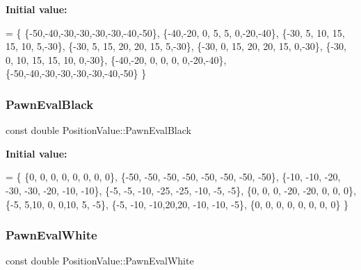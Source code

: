 {\bfseries Initial value\+:}
\begin{DoxyCode}
=
        \{
                \{-50,-40,-30,-30,-30,-30,-40,-50\},
                \{-40,-20,  0,  5,  5,  0,-20,-40\},
                \{-30,  5, 10, 15, 15, 10,  5,-30\},
                \{-30,  5, 15, 20, 20, 15,  5,-30\},
                \{-30,  0, 15, 20, 20, 15,  0,-30\},
                \{-30,  0, 10, 15, 15, 10,  0,-30\},
                \{-40,-20,  0,  0,  0,  0,-20,-40\},
                \{-50,-40,-30,-30,-30,-30,-40,-50\}
        \}
\end{DoxyCode}
\mbox{\label{class_position_value_a4b09d260029ea68a73f44ddf92db45be}} 
\subsubsection{\texorpdfstring{Pawn\+Eval\+Black}{PawnEvalBlack}}
{\footnotesize\ttfamily const double Position\+Value\+::\+Pawn\+Eval\+Black\hspace{0.3cm}{\ttfamily [static]}}

{\bfseries Initial value\+:}
\begin{DoxyCode}
=
        \{
                \{0,  0,  0,  0,  0,  0,  0,  0\},
                \{-50, -50, -50, -50, -50, -50, -50, -50\},
                \{-10, -10, -20, -30, -30, -20, -10, -10\},
                \{-5,  -5, -10, -25, -25, -10,  -5,  -5\},
                \{0,  0,  0, -20, -20,  0,  0,  0\},
                \{-5, 5,10,  0,  0,10, 5,  -5\},
                \{-5, -10, -10,20,20, -10, -10,  -5\},
                \{0,  0,  0,  0,  0,  0,  0,  0\}
        \}
\end{DoxyCode}
\mbox{\label{class_position_value_adbc7e125bfdd9749060f62e269e9b02a}} 
\subsubsection{\texorpdfstring{Pawn\+Eval\+White}{PawnEvalWhite}}
{\footnotesize\ttfamily const double Position\+Value\+::\+Pawn\+Eval\+White\hspace{0.3cm}{\ttfamily [static]}}

